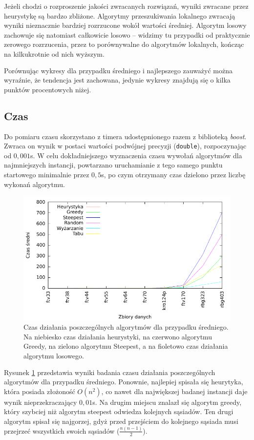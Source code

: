 Jeżeli chodzi o rozproszenie jakości zwracanych rozwiązań, wyniki zwracane przez heurystykę są bardzo zbliżone. Algorytmy przeszukiwania lokalnego zwracają wyniki nieznacznie bardziej rozrzucone wokół wartości średniej. Algorytm losowy zachowuje się natomiast całkowicie losowo -- widzimy tu przypadki od praktycznie zerowego rozrzucenia, przez to porównywalne do algorytmów lokalnych, kończąc na kilkukrotnie od nich wyższym.

Porównując wykresy dla przypadku średniego i najlepszego zauważyć można wyraźnie, że tendencja jest zachowana, jedynie wykresy znajdują się o kilka punktów procentowych niżej.

\subsection{Czas}
Do pomiaru czasu skorzystano z timera udostępnionego razem z biblioteką \emph{boost}. Zwraca on wynik w postaci wartości podwójnej precyzji (\texttt{double}), rozpoczynając od $0,001$s. W celu dokładniejszego wyznaczenia czasu wywołań algorytmów dla najmniejszych instancji, powtarzano uruchamianie z tego samego punktu startowego minimalnie przez $0,5$s, po czym otrzymany czas dzielono przez liczbę wykonań algorytmu.

\begin{figure}[!h]
\centering\includegraphics[width=12cm]{img/czas_avg}
\caption{Czas działania poszczególnych algorytmów dla przypadku średniego. Na niebiesko czas działania heurystyki, na czerwono algorytmu Greedy, na zielono algorytmu Steepest, a na fioletowo czas działania algorytmu losowego.}\label{rys:czas_avg}
\end{figure}

Rysunek \ref{rys:czas_avg} przedstawia wyniki badania czasu działania poszczególnych algorytmów dla przypadku średniego. Ponownie, najlepiej spisała się heurytyka, która posiada złożoność $O(n^2)$, co nawet dla największej badanej instancji daje wynik nieprzekraczający $0,01$s. Na drugim miejscu znalazł się algorytm greedy, który szybciej niż algorytm steepest odwiedza kolejnych sąsiadów. Ten drugi algorytm spisał się najgorzej, gdyż przed przejściem do kolejnego sąsiada musi przejrzeć wszystkich swoich sąsiadów ($\frac{n(n-1)}{2}$).

